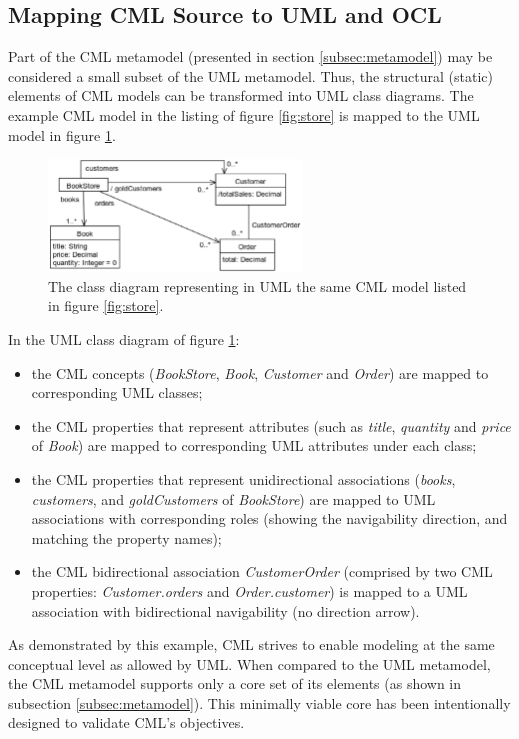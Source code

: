 \subsection{Mapping CML Source to UML and OCL}\label{subsec:mapping}

Part of the CML metamodel (presented in section \ref{subsec:metamodel}) may be considered a small subset of the UML  \cite{uml} metamodel.
Thus, the structural (static) elements of CML models can be transformed into UML class diagrams. The example CML model in the listing of figure \ref{fig:store} is mapped to the UML model in figure \ref{fig:uml}.

\begin{figure}
\centering
\includegraphics[width=0.6\textwidth]{language/diagram-uml}
\caption{The class diagram representing in UML  \cite{uml} the same CML model listed in figure \ref{fig:store}.}
\label{fig:uml}
\end{figure}

In the UML class diagram of figure \ref{fig:uml}:
\begin{itemize}
\item the CML concepts (\emph{BookStore}, \emph{Book}, \emph{Customer} and \emph{Order}) are mapped to corresponding UML classes;
\item the CML properties that represent attributes
(such as \emph{title}, \emph{quantity} and \emph{price} of \emph{Book})
are mapped to corresponding UML attributes under each class;
\item the CML properties that represent unidirectional associations
(\emph{books}, \emph{customers}, and \emph{goldCustomers} of \emph{BookStore})
are mapped to UML associations with corresponding roles
(showing the navigability direction, and matching the property names);
\item the CML bidirectional association \emph{CustomerOrder}
(comprised by two CML properties: \emph{Customer.orders} and \emph{Order.customer})
is mapped to a UML association with bidirectional navigability (no direction arrow).
\end{itemize}

As demonstrated by this example,
CML strives to enable modeling at the same conceptual level as allowed by UML.
When compared to the UML metamodel,
the CML metamodel supports only a core set of its elements (as shown in subsection \ref{subsec:metamodel}).
This minimally viable core has been intentionally designed to validate CML's objectives.

